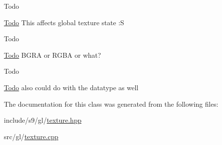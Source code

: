 \begin{DoxyRefDesc}{Todo}
\item[\hyperlink{todo__todo000002}{Todo}]This affects global texture state \-:S \end{DoxyRefDesc}


\begin{DoxyRefDesc}{Todo}
\item[\hyperlink{todo__todo000003}{Todo}]B\-G\-R\-A or R\-G\-B\-A or what? \end{DoxyRefDesc}
\begin{DoxyRefDesc}{Todo}
\item[\hyperlink{todo__todo000004}{Todo}]also could do with the datatype as well \end{DoxyRefDesc}


The documentation for this class was generated from the following files\-:\begin{DoxyCompactItemize}
\item 
include/s9/gl/\hyperlink{texture_8hpp}{texture.\-hpp}\item 
src/gl/\hyperlink{texture_8cpp}{texture.\-cpp}\end{DoxyCompactItemize}
